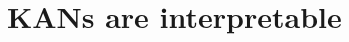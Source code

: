 \documentclass{article}
\numberwithin{equation}{section}
\numberwithin{figure}{section}
\newcommand{\todo}[1]{{\color{black!0!blue} #1}}
\begin{document}

\section{KANs are interpretable}\label{sec:kan_interpretability_experiment}






\end{document}

